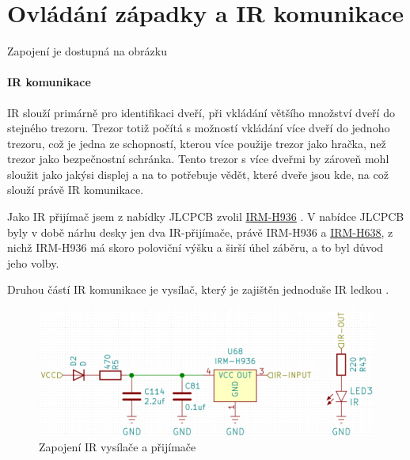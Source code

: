 \section{Ovládání západky a IR komunikace}

Zapojení je dostupná na obrázku 

\paragraph{IR komunikace}
IR slouží primárně pro identifikaci dveří, při vkládání většího množství dveří do stejného trezoru.
Trezor totiž počítá s možností vkládání více dveří do jednoho trezoru, což je jedna ze schopností, kterou více použije trezor jako hračka, než trezor jako bezpečnostní schránka.
Tento trezor s více dveřmi by zároveň mohl sloužit jako jakýsi displej a na to potřebuje vědět, které dveře jsou kde, na což slouží právě IR komunikace. %

Jako IR přijímač jsem z nabídky JLCPCB \parencite{JLCPCB} zvolil \href{https://datasheet.lcsc.com/szlcsc/1912111437_Everlight-Elec-IRM-H936-TR2_C264266.pdf}{IRM-H936} \parencite{irm-h936}. 
V nabídce JLCPCB byly v době nárhu desky jen dva IR-přijímače, právě IRM-H936 a \href{https://datasheet.lcsc.com/szlcsc/2010221806_Everlight-Elec-IRM-H638T-TR2-DX_C390031.pdf}{IRM-H638},
z nichž IRM-H936 má skoro poloviční výšku a širší úhel záběru, a to byl důvod jeho volby.

Druhou částí IR komunikace je vysílač, který je zajištěn jednoduše IR ledkou \parencite{ir19-21c/tr8}.

\begin{figure}[htbp]
    \centering
    \includegraphics[width=\textwidth]{kapitoly/obrazky/E4/ir_motor_enkoder/IR.png}
    \caption{Zapojení IR vysílače a přijímače}
    \label{fig:E4-ir}
\end{figure}

\newpage

